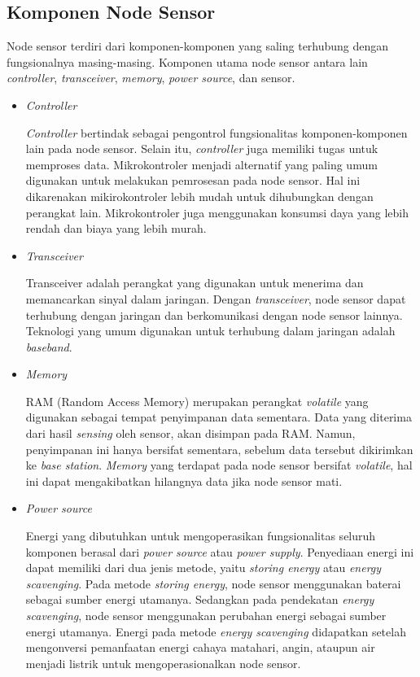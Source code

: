 \subsection{Komponen Node Sensor}

Node sensor terdiri dari komponen-komponen yang saling terhubung dengan fungsionalnya masing-masing. Komponen utama node sensor antara lain \textit{controller}, \textit{transceiver}, \textit{memory}, \textit{power source}, dan sensor.

\begin{itemize}
    \item \textit{Controller}
    
    \textit{Controller} bertindak sebagai pengontrol fungsionalitas komponen-komponen lain pada node sensor. Selain itu, \textit{controller} juga memiliki tugas untuk memproses data. Mikrokontroler menjadi alternatif yang paling umum digunakan untuk melakukan pemrosesan pada node sensor. Hal ini dikarenakan mikirokontroler lebih mudah untuk dihubungkan dengan perangkat lain. Mikrokontroler juga menggunakan konsumsi daya yang lebih rendah dan biaya yang lebih murah.
    
    \item \textit{Transceiver}
    
    Transceiver adalah perangkat yang digunakan untuk menerima dan memancarkan sinyal dalam jaringan. Dengan \textit{transceiver}, node sensor dapat terhubung dengan jaringan dan berkomunikasi dengan node sensor lainnya. Teknologi yang umum digunakan untuk terhubung dalam jaringan adalah \textit{baseband}.
    
    \item \textit{Memory}
    
    RAM (Random Access Memory) merupakan perangkat \textit{volatile} yang digunakan sebagai tempat penyimpanan data sementara. Data yang diterima dari hasil \textit{sensing} oleh sensor, akan disimpan pada RAM. Namun, penyimpanan ini hanya bersifat sementara, sebelum data tersebut dikirimkan ke \textit{base station}. \textit{Memory} yang terdapat pada node sensor bersifat \textit{volatile}, hal ini dapat mengakibatkan hilangnya data jika node sensor mati. 
    
    \item \textit{Power source}
    
    Energi yang dibutuhkan untuk mengoperasikan fungsionalitas seluruh komponen berasal dari \textit{power source} atau \textit{power supply}. Penyediaan energi ini dapat memiliki dari dua jenis metode, yaitu \textit{storing energy} atau \textit{energy scavenging}. Pada metode \textit{storing energy}, node sensor menggunakan baterai sebagai sumber energi utamanya. Sedangkan pada pendekatan \textit{energy scavenging}, node sensor menggunakan perubahan energi sebagai sumber energi utamanya. Energi pada metode \textit{energy scavenging} didapatkan setelah mengonversi pemanfaatan energi cahaya matahari, angin, ataupun air menjadi listrik untuk mengoperasionalkan node sensor.
    

\end{itemize}
